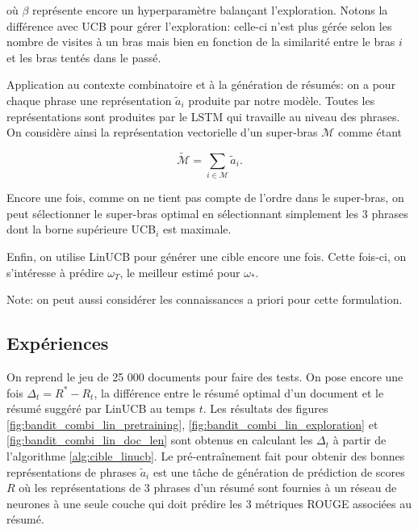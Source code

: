 où $\beta$ représente encore un hyperparamètre balançant l'exploration.
Notons la différence avec UCB pour gérer l'exploration: celle-ci n'est plus gérée
selon les nombre de visites à un bras mais bien en fonction de la similarité entre le bras
$i$ et les bras tentés dans le passé.

Application au contexte combinatoire et à la génération de résumés: on a pour chaque
phrase une représentation $\tilde{a}_i$ produite par notre modèle.
Toutes les représentations sont produites par le LSTM qui travaille au niveau des phrases.
On considère ainsi la représentation vectorielle d'un super-bras $\mathcal{M}$ comme étant

\begin{equation}
    \tilde{\mathcal{M}} = \sum_{i \in \mathcal{M}} \tilde{a}_i.
\end{equation}

Encore une fois, comme on ne tient pas compte de l'ordre dans le super-bras, on peut
sélectionner le super-bras optimal en sélectionnant simplement les 3 phrases dont
la borne supérieure UCB$_i$ est maximale.

Enfin, on utilise LinUCB pour générer une cible encore une fois.
Cette fois-ci, on s'intéresse à prédire $\omega_T$, le meilleur estimé pour $\omega_*$.

Note: on peut aussi considérer les connaissances a priori pour cette formulation.

\subsection{Expériences}


On reprend le jeu de 25 000 documents pour faire des tests.
On pose encore une fois  $\Delta_t = R^* - R_t$, la différence entre le résumé
optimal d'un document et le résumé suggéré par LinUCB au temps $t$.
Les résultats des figures \ref{fig:bandit_combi_lin_pretraining}, \ref{fig:bandit_combi_lin_exploration}
et \ref{fig:bandit_combi_lin_doc_len} sont obtenus en calculant les $\Delta_t$ à partir de
l'algorithme \ref{alg:cible_linucb}.
Le pré-entraînement fait pour obtenir des bonnes représentations de phrases $\tilde{a}_i$
est une tâche de génération de prédiction de scores $R$ où les représentations de 3 phrases
d'un résumé sont fournies à un réseau de neurones à une seule couche qui doit prédire
les 3 métriques ROUGE associées au résumé.

